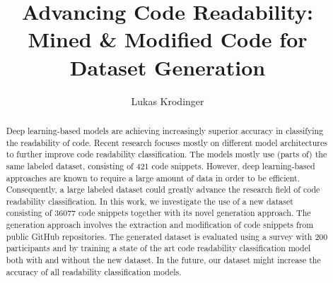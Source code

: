 \documentclass[%
class=scrreprt,
chapterprefix=false,%
open=right,%
twoside=false,%
paper=a4,%
logofile={Logo\_zentral\_farbig\_EN.png},%
thesistype=master,%
UKenglish,%
]{se2thesis}
\author{Lukas Krodinger}
\title{Advancing Code Readability: Mined \& Modified Code for Dataset Generation}
\institute{Chair of Software Engineering II}
\theoremstyle{definition}
\newcommand{\numSamples}{36077 }
\begin{document}
	
	\frontmatter
	
	\maketitle
	
	\begin{abstract}
		
		
		Deep learning-based models are achieving increasingly superior accuracy in classifying the readability of code.
		Recent research focuses mostly on different model architectures to further improve code readability classification. The models mostly use (parts of) the same labeled dataset, consisting of 421 code snippets.
		However, deep learning-based approaches are known to require a large amount of data in order to be efficient.
		Consequently, a large labeled dataset could greatly advance the research field of code readability classification.
		In this work, we investigate the use of a new dataset consisting of \numSamples code snippets together with its novel generation approach.
		The generation approach involves the extraction and modification of code snippets from public GitHub repositories. The generated dataset is evaluated using a survey with 200 participants and by training a state of the art code readability classification model both with and without the new dataset.
		In the future, our dataset might increase the accuracy of all readability classification models.
		

	\end{abstract}
	
\end{document}
